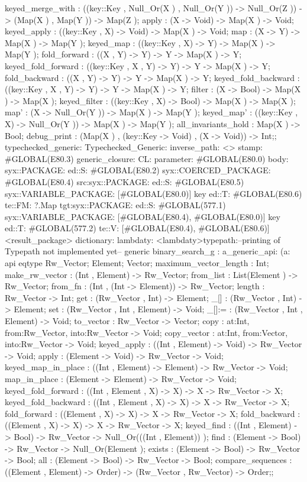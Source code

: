 {        keyed_merge_with :
        ((key::Key , Null_Or(X ) , Null_Or(Y )) -> Null_Or(Z )) -> (Map(X ) , Map(Y )) -> Map(Z );
    apply : (X -> Void) -> Map(X ) -> Void;
    keyed_apply : ((key::Key , X) -> Void) -> Map(X ) -> Void;
    map : (X -> Y) -> Map(X ) -> Map(Y );
    keyed_map : ((key::Key , X) -> Y) -> Map(X ) -> Map(Y );
    fold_forward : ((X , Y) -> Y) -> Y -> Map(X ) -> Y;
    keyed_fold_forward : ((key::Key , X , Y) -> Y) -> Y -> Map(X ) -> Y;
    fold_backward : ((X , Y) -> Y) -> Y -> Map(X ) -> Y;
    keyed_fold_backward : ((key::Key , X , Y) -> Y) -> Y -> Map(X ) -> Y;
    filter : (X -> Bool) -> Map(X ) -> Map(X );
    keyed_filter : ((key::Key , X) -> Bool) -> Map(X ) -> Map(X );
    map' : (X -> Null_Or(Y )) -> Map(X ) -> Map(Y );
    keyed_map' : ((key::Key , X) -> Null_Or(Y )) -> Map(X ) -> Map(Y );
    all_invariants_hold : Map(X ) -> Bool;
    debug_print : (Map(X ) , (key::Key -> Void) , (X -> Void)) -> Int;};
typechecked_generic:
Typechecked_Generic:
inverse_path: <>
stamp: #GLOBAL(E80.3)
generic_closure:
CL:
parameter: #GLOBAL(E80.0)
body: syx::PACKAGE:
        ed::S: #GLOBAL(E80.2)
            syx::COERCED_PACKAGE:
                #GLOBAL(E80.4)
                 src:syx::PACKAGE:
                        ed::S: #GLOBAL(E80.5) syx::VARIABLE_PACKAGE: [#GLOBAL(E80.0)] key
                        ed::T: #GLOBAL(E80.6) te::FM: ?.Map
                tgt:syx::PACKAGE:
                    ed::S: #GLOBAL(577.1)
                     syx::VARIABLE_PACKAGE:
                     [#GLOBAL(E80.4), #GLOBAL(E80.0)]
                     key
                    ed::T: #GLOBAL(577.2)
                     te::V:
                     [#GLOBAL(E80.4), #GLOBAL(E80.6)]
         <result_package>
dictionary:
lambdaty:
  <lambdaty>typepath:--printing of Typepath not implemented yet--
generic binary_search_g
:
a_generic_api:
(a:
api {
    eqtype Rw_Vector;
    Element;
    Vector;
    maximum_vector_length : Int;
    make_rw_vector : (Int , Element) -> Rw_Vector;
    from_list : List(Element ) -> Rw_Vector;
    from_fn : (Int , (Int -> Element)) -> Rw_Vector;
    length : Rw_Vector -> Int;
    get : (Rw_Vector , Int) -> Element;
    _[] : (Rw_Vector , Int) -> Element;
    set : (Rw_Vector , Int , Element) -> Void;
    _[]:= : (Rw_Vector , Int , Element) -> Void;
    to_vector : Rw_Vector -> Vector;
    copy : {at:Int, from:Rw_Vector, into:Rw_Vector} -> Void;
    copy_vector : {at:Int, from:Vector, into:Rw_Vector} -> Void;
    keyed_apply : ((Int , Element) -> Void) -> Rw_Vector -> Void;
    apply : (Element -> Void) -> Rw_Vector -> Void;
    keyed_map_in_place : ((Int , Element) -> Element) -> Rw_Vector -> Void;
    map_in_place : (Element -> Element) -> Rw_Vector -> Void;
    keyed_fold_forward : ((Int , Element , X) -> X) -> X -> Rw_Vector -> X;
    keyed_fold_backward : ((Int , Element , X) -> X) -> X -> Rw_Vector -> X;
    fold_forward : ((Element , X) -> X) -> X -> Rw_Vector -> X;
    fold_backward : ((Element , X) -> X) -> X -> Rw_Vector -> X;
    keyed_find : ((Int , Element) -> Bool) -> Rw_Vector -> Null_Or(((Int , Element)) );
    find : (Element -> Bool) -> Rw_Vector -> Null_Or(Element );
    exists : (Element -> Bool) -> Rw_Vector -> Bool;
    all : (Element -> Bool) -> Rw_Vector -> Bool;
    compare_sequences : ((Element , Element) -> Order) -> (Rw_Vector , Rw_Vector) -> Order;};
